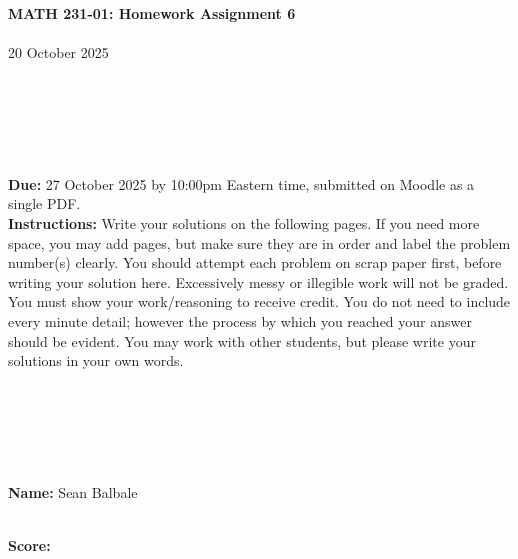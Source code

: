\documentclass[reqno, 12pt]{amsart}
\begin{document}
\begin{center}
  {\bf MATH 231-01: Homework Assignment 6}\\~\\
  20 October 2025\\~\\~\\~\\~\\~\\
\end{center}

{\bf Due:} 27 October 2025 by 10:00pm Eastern time, submitted on Moodle as a single PDF.~\\


{\bf Instructions:} Write your solutions on the following pages. If you need more space, you may add pages, but make sure they are in order and label the problem number(s) clearly. You should attempt each problem on scrap paper first, before writing your solution here. Excessively messy or illegible work will not be graded. You must show your work/reasoning to receive credit. You do not need to include every minute detail; however the process by which you reached your answer should be evident. You may work with other students, but please write your solutions in your own words.

~\\~\\~\\~\\~\\
{\bf Name:} Sean Balbale

~\\
{\bf Score:}
\end{document}
